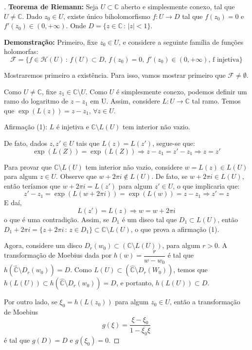 \begin{proof}[]

\textbf{Teorema de Riemann:} Seja $U\subset\mathbb{C}$ aberto e simplesmente conexo, tal que $U\neq\mathbb{C}$. Dado $z_0\in U$, existe único biholomorfismo $f\colon U\longrightarrow D$ tal que $f(z_0) = 0$ e $f'(z_0)\in (0,+\infty)$. Onde $D=\{z\in\mathbb{C}\,:\,|z|<1\}$.

\textbf{Demonstração: } Primeiro, fixe $z_0\in U$, e considere a seguinte família de funções holomorfas: $$\mathcal{F}=\{f\in\mathcal{H}(U)\,:\,f(U)\subset D,\,f(z_0)=0,\,f'(z_0)\in(0,+\infty),\,\textrm{f injetiva}\}$$

Mostraremos primeiro a existência. Para isso, vamos mostrar primeiro que $\mathcal{F}\neq\emptyset$.

Como $U\neq\mathbb{C}$, fixe $z_1\in\mathbb{C}\setminus U$. Como $U$ é simplesmente conexo, podemos definir um ramo do logaritmo de $z-z_1$ em U. Assim, considere $L\colon U\longrightarrow \mathbb{C}$ tal ramo. Temos que $\exp({L(z)}) = z-z_1$, $\forall z\in U$.

Afirmação (1): $L$ é injetiva e $\mathbb{C}\setminus L(U)$ tem interior não vazio. 

De fato, dados $z,z'\in U$ tais que $L(z)=L(z')$, segue-se que: $$\exp({L(Z)}) = \exp({L(Z)})\Longrightarrow z-z_1 = z'-z_1\Longrightarrow z=z'$$

 Para provar que $\mathbb{C}\setminus L(U)$ tem interior não vazio, considere $w=L(z)\in L(U)$ para algum $z\in U$. Observe que $w+2\pi i\notin L(U)$. De fato, se $w+2\pi i \in L(U)$, então teríamos que $w+2\pi i = L(z')$ para algum $z'\in U$, o que implicaria que: $$z'-z_1 = \exp({L(w+2\pi i)}) = \exp({L(w)}) = z - z_1\Longrightarrow z'=z$$
 E daí, $$L(z')=L(z)\Longrightarrow w = w+2\pi i$$o que é uma contradição. Assim, se $D_1$ é um disco tal que $D_1\subset L(U)$, então $D_1+2\pi i = \{z+2\pi i\,:\, z\in D_1\}\subset \mathbb{C}\setminus L(U)$, o que prova a afirmação (1). 

 Agora, considere um disco $D_r(w_0)\subset(\mathbb{C}\setminus L(U))$, para algum $r>0$. A transformação de Moebius dada por $h(w) = \dfrac{r}{w-w_0}$ é tal que $h(\hat{\mathbb{C}}\setminus D_r(w_0)) = D$. Como $L(U)\subset(\hat{\mathbb{C}}\setminus D_r(W_0))$, temos que $h(L(U))\subset h(\hat{\mathbb{C}}\setminus D_r(w_0)) = D$, e portanto, $h(L(U))\subset D$.
 
Por outro lado, se $\xi_0 = h(L(z_0))$ para algum $z_0\in U$, então a transformação de Moebius $$g(\xi)=\dfrac{\xi -\xi_0}{1-\overline{\xi_0}\xi}$$ é tal que $g(D) = D$ e $g(\xi_0)=0$.


\end{proof}
